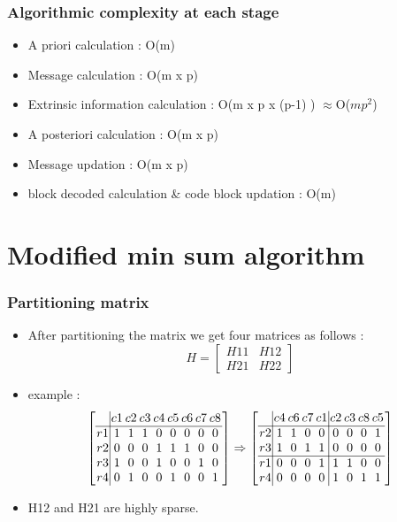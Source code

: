 \documentclass[xcolor=dvipsname]
{beamer}
\begin{document}
\begin{frame}[t]
\frametitle{ Algorithmic complexity at each stage }  
\begin{itemize}
\item A priori calculation	:	O(m) 
\item Message calculation 	:	O(m x p)
\item Extrinsic information calculation	: O(m x p x (p-1) ) $\approx $O($mp^{2}$)
\item A posteriori calculation : O(m x p)
\item Message updation : O(m x p)
\item block decoded calculation \& code block updation	: O(m)
\end{itemize}
\end{frame}

\section{ Modified min sum algorithm}
\begin{frame}[t]
\frametitle{ Partitioning matrix  }  
\begin{itemize}
\item After partitioning the matrix we get four matrices as follows 	:
\[
H = \left[ \begin{array}{c|c}  
H11  & H12     \\ \hline
H21  & H22     \end{array} \right] 
\] 
\item example :
\[
\begingroup %
\setlength\arraycolsep{1pt}
\left[ \begin{array} {c|cccccccc} 
  &    c1 &   c2 &   c3 &  c4  &  c5  &  c6  &  c7  &  c8 \\ \hline
r1 &    1  &   1  &   1  &   0  &   0  &   0  &   0  &   0 \\
r2 &    0  &   0  &   0  &   1  &   1  &   1  &   0  &   0 \\ 
r3 &    1  &   0  &   0  &   1  &   0  &   0  &   1  &   0 \\
r4 &    0  &   1  &   0  &   0  &   1  &   0  &   0  &   1 \end{array} \right] 
     \Rightarrow
\left[ \begin{array} {c|cccc|cccc} 
  &    c4 &   c6 &   c7 &  c1  &  c2  &  c3  &  c8  &  c5 \\ \hline  
r2 &     1  &   1  &   0  &   0  &   0  &   0  &   0  &   1 \\
r3 &     1  &   0  &   1  &   1  &   0  &   0  &   0  &   0 \\ \hline
r1 &     0  &   0  &   0  &   1  &   1  &   1  &   0  &   0 \\
r4 &     0  &   0  &   0  &   0  &   1  &   0  &   1  &   1 \end{array} \right] 
\endgroup
\]
\item H12 and H21 are highly sparse.
\end{itemize}
\end{frame}
\end{document}
